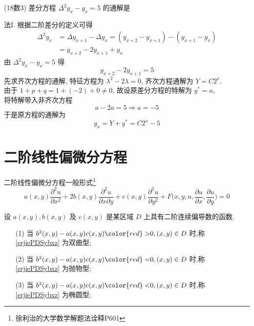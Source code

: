 \documentclass[color=green,titlestyle=hang]{elegantbook}%
\begin{document}
\begin{example}(18数3)
差分方程 $\Delta^2y_x-y_x=5$  的通解是\;\underline{}
\end{example}\begin{solution}
法I. 根据二阶差分的定义可得
\begin{align*}
\Delta^2y_x&=\Delta y_{x+1}-\Delta y_x=(y_{x+2}-y_{x+1})-(y_{x+1}-y_x)\\
&=y_{x+2}-2y_{x+1}+y_{x}
\end{align*}
由 $\Delta^2y_x-y_{x}=5$ 得 \[y_{x+2}-2y_{x+1}=5\]
先求齐次方程的通解, 特征方程为 $\lambda^2-2\lambda=0$, 齐次方程通解为 $Y=C2^x$. \\
由于 $1+p+q=1+(-2)+0\neq0$, 故设原差分方程的特解为 $y^*=a$, \\
将特解带入非齐次方程
\[a-2a=5\Longrightarrow a=-5\]
于是原方程的通解为 \[y_x=Y+y^*=C2^x-5\]
\end{solution}

\section{二阶线性偏微分方程}
\begin{definition}{二阶线性偏微分方程一般形式\footnote{徐利治的大学数学解题法诠释P601}}{}
\begin{equation}\label{erjiePDSybxz}
a(x,y)\frac{\partial^2u}{\partial x^2}+2b(x,y)\frac{\partial^2u}{\partial x\partial y}+c(x,y)\frac{\partial^2u}{\partial y^2}+F\bigg(x,y,u,\frac{\partial u}{\partial x},\frac{\partial u}{\partial y}\bigg)=0
\end{equation}
\end{definition}
\par 设 $a(x,y),b(x,y)$ 及 $c(x,y)$ 是某区域 $D$ 上具有二阶连续偏导数的函数.
\begin{enumerate}
\item[(1)] 当 $b^2(x,y)-a(x,y)c(x,y){\color{red}>}0,(x,y)\in D$ 时,称 \eqref{erjiePDSybxz} 为{\heiti 双曲型}; 
\item[(2)] 当 $b^2(x,y)-a(x,y)c(x,y){\color{red}=}0,(x,y)\in D$ 时,称 \eqref{erjiePDSybxz} 为{\heiti 抛物型}; 
\item[(3)] 当 $b^2(x,y)-a(x,y)c(x,y){\color{red}<}0,(x,y)\in D$ 时,称 \eqref{erjiePDSybxz} 为{\heiti 椭圆型}; 
\end{enumerate}
\end{document}
